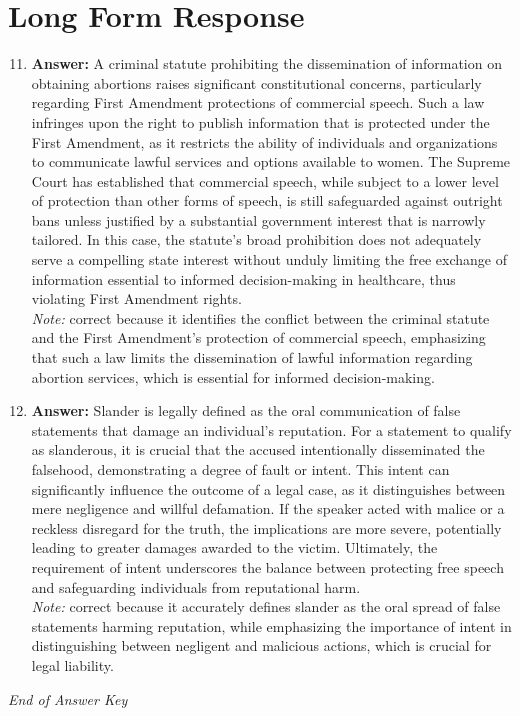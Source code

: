 \documentclass[12pt]{article}
\begin{document}
\section*{Long Form Response}
\begin{enumerate}[label=\arabic*.]
\setcounter{enumi}{10}
\item \textbf{Answer:} A criminal statute prohibiting the dissemination of information on obtaining abortions raises significant constitutional concerns, particularly regarding First Amendment protections of commercial speech. Such a law infringes upon the right to publish information that is protected under the First Amendment, as it restricts the ability of individuals and organizations to communicate lawful services and options available to women. The Supreme Court has established that commercial speech, while subject to a lower level of protection than other forms of speech, is still safeguarded against outright bans unless justified by a substantial government interest that is narrowly tailored. In this case, the statute's broad prohibition does not adequately serve a compelling state interest without unduly limiting the free exchange of information essential to informed decision-making in healthcare, thus violating First Amendment rights.
\\ \textit{Note:} correct because it identifies the conflict between the criminal statute and the First Amendment's protection of commercial speech, emphasizing that such a law limits the dissemination of lawful information regarding abortion services, which is essential for informed decision-making.
\item \textbf{Answer:} Slander is legally defined as the oral communication of false statements that damage an individual's reputation. For a statement to qualify as slanderous, it is crucial that the accused intentionally disseminated the falsehood, demonstrating a degree of fault or intent. This intent can significantly influence the outcome of a legal case, as it distinguishes between mere negligence and willful defamation. If the speaker acted with malice or a reckless disregard for the truth, the implications are more severe, potentially leading to greater damages awarded to the victim. Ultimately, the requirement of intent underscores the balance between protecting free speech and safeguarding individuals from reputational harm.
\\ \textit{Note:} correct because it accurately defines slander as the oral spread of false statements harming reputation, while emphasizing the importance of intent in distinguishing between negligent and malicious actions, which is crucial for legal liability.
\end{enumerate}

\vfill
\noindent\textit{End of Answer Key}
\end{document}
